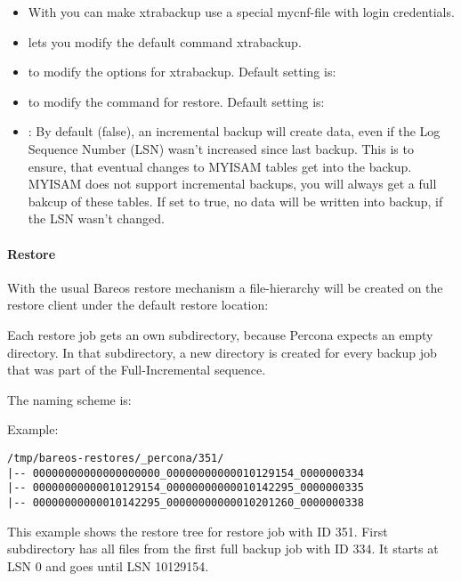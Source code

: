 \begin{itemize}
 \item With  you can make xtrabackup use a special mycnf-file with login credentials.
 \item {} lets you modify the default command xtrabackup.
 \item {} to modify the options for xtrabackup. Default setting is:  
 \item {} to modify the command for restore. Default setting is: 
 \item {}: By default (false), an incremental backup will create data, even if the Log Sequence Number (LSN) wasn't increased since last backup. 
 This is to ensure, that eventual 
 changes to MYISAM tables get into the backup. MYISAM does not support incremental backups, you will always get a full bakcup of these tables. 
 If set to true, no data will be written into backup, if the LSN wasn't changed.
 \end{itemize}
 
\paragraph{Restore}

With the usual Bareos restore mechanism a file-hierarchy will be created on the restore client under the default restore location:


Each restore job gets an own subdirectory, because Percona expects an empty directory. In that subdirectory, a new directory is created for every backup job that was part of the Full-Incremental sequence.

The naming scheme is: 

Example:
\begin{verbatim}
/tmp/bareos-restores/_percona/351/
|-- 00000000000000000000_00000000000010129154_0000000334
|-- 00000000000010129154_00000000000010142295_0000000335
|-- 00000000000010142295_00000000000010201260_0000000338
\end{verbatim}

This example shows the restore tree for restore job with ID 351. First subdirectory has all files from the first full backup job with ID 334. 
It starts at LSN 0 and goes until LSN 10129154.

